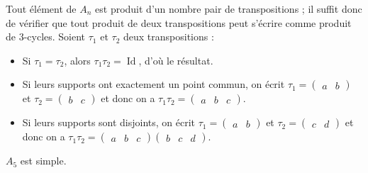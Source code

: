 	\begin{demonstration}
		Tout élément de $A_n$ est produit d'un nombre pair de transpositions ; il suffit donc de vérifier que tout produit de deux transpositions peut s'écrire comme produit de $3$-cycles. Soient $\tau_1$ et $\tau_2$ deux transpositions :
		\begin{itemize}
			\item Si $\tau_1 = \tau_2$, alors $\tau_1 \tau_2 = \operatorname{Id}$, d'où le résultat.
			\item Si leurs supports ont exactement un point commun, on écrit $\tau_1 = \begin{pmatrix} a & b \end{pmatrix}$ et $\tau_2 = \begin{pmatrix} b & c \end{pmatrix}$ et donc on a $\tau_1 \tau_2 =  \begin{pmatrix} a & b & c \end{pmatrix}$.
			\item Si leurs supports sont disjoints, on écrit $\tau_1 = \begin{pmatrix} a & b \end{pmatrix}$ et $\tau_2 = \begin{pmatrix} c & d \end{pmatrix}$ et donc on a $\tau_1 \tau_2 =  \begin{pmatrix} a & b & c \end{pmatrix}\begin{pmatrix} b & c & d \end{pmatrix}$.
		\end{itemize}
	\end{demonstration}


	\begin{lemma}
		\label{simplicite-du-groupe-alterne-3}
		$A_5$ est simple.
	\end{lemma}

